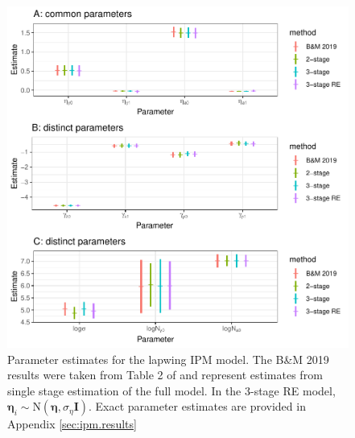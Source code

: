\documentclass[12pt]{article}
\newcommand{\bn}{\boldsymbol{\eta}}
\newcommand{\tN}{\text{N}}
\newcommand{\bI}{\mathbf{I}}
\begin{document}
\clearpage

\begin{figure}
\includegraphics[width=6.5in]{effects_all} 
\caption{\label{fig:ipm} Parameter estimates for the lapwing IPM model. The B\&M 2019 results were taken from Table 2 of \citet{besbeas2019exact} and represent estimates from single stage estimation of the full model. In the 3-stage RE model, $\bn_i \sim \tN(\bn,\sigma_{\eta}\bI)$. Exact parameter estimates are provided in Appendix \ref{sec:ipm.results}}
\end{figure}


\clearpage
\end{document}
